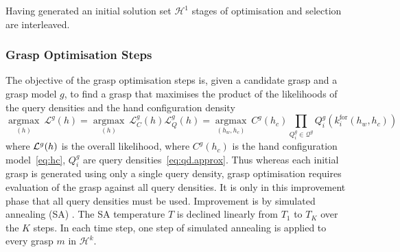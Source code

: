 \documentclass[a4paper, 10pt, conference]{ieeeconf}      %
\newcommand{\hc}{C}
\newcommand{\qd}{Q}
\newcommand{\argmax}[1]{\underset{#1}{\operatorname{argmax}}\medspace}
\begin{document}
Having generated an initial solution set $\mathcal{H}^{1}$ stages of optimisation and selection are interleaved.

\subsubsection{Grasp Optimisation Steps}
The objective of the grasp optimisation steps is, given a candidate grasp and a grasp model $g$, to find a grasp that maximises the product of the likelihoods of the query densities and the hand configuration density
\begin{equation}
\argmax{(h)}  \mathcal{L}^g(h) = \argmax{(h)}  \mathcal{L}^g_\hc(h) \mathcal{L}^g_\qd(h) = \argmax{(h_w, h_c)}   \hc^{g}(h_c) \prod_{\qd_i^g \in \mathcal{Q}^g} \qd_i^g\left(k_{i}^{\mathrm{for}}\left(h_w, h_c\right)\right)
\label{eq:grasping.product}
\end{equation}
where ${\cal L}^g(h)$ is the overall likelihood, where $\hc^g(h_c)$ is the hand configuration model~\eqref{eq:hc}, $\qd_i^g$ are query densities~\eqref{eq:qd.approx}. Thus whereas each initial grasp is generated using only a single query density, grasp optimisation requires evaluation of the grasp against all query densities. It is only in this improvement phase that all query densities must be used.
 Improvement is by simulated annealing (SA) \cite{kirkpatrick83optimizationby}. The SA temperature $T$ is declined linearly from $T_{1}$ to $T_{K}$ over the $K$ steps. In each time step, one step of simulated annealing is applied to every grasp $m$ in $\mathcal{H}^k$.
\end{document}
